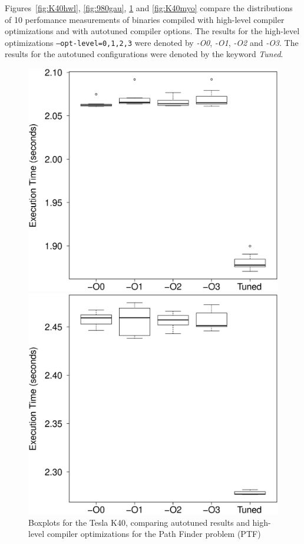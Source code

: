 Figures~\ref{fig:K40hwl}, \ref{fig:980gau}, \ref{fig:K40ptf} and
\ref{fig:K40myo} compare the distributions of 10 perfomance measurements of
binaries compiled with high-level compiler optimizations and with autotuned
compiler options. The results for the high-level optimizations
\texttt{--opt-level=0,1,2,3} were denoted by \emph{-O0}, \emph{-O1}, \emph{-O2}
and \emph{-O3}.  The results for the autotuned configurations were denoted by
the keyword \emph{Tuned}.

\begin{figure}[htpb]
    \centering
    \begin{minipage}{.48\textwidth}
        \centering
        \includegraphics[scale=.22]{./images/Pathfinder-0-Tesla-K40-Box.eps}
        \caption{Boxplots for the Tesla K40, comparing autotuned results and high-level compiler optimizations for the Path Finder problem (PTF)}
        \label{fig:K40ptf}
    \end{minipage}%
    \hfill
    \begin{minipage}{.48\textwidth}
        \centering
        \includegraphics[scale=.22]{./images/myocyte-0-Tesla-K40-Box.eps}

\end{minipage}
\end{figure}
